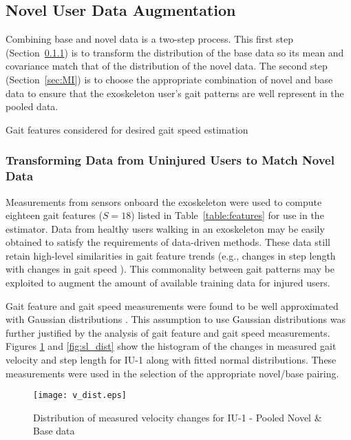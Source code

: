 \subsection{Novel User Data Augmentation}

Combining base and novel data is a two-step process. This first step (Section~\ref{sec:mp_transform}) is to transform the distribution of the base data so its mean and covariance match that of the distribution of the novel data. The second step (Section~\ref{sec:MI}) is to choose the appropriate combination of novel and base data to ensure that the exoskeleton user's gait patterns are well represent in the pooled data.

\begin{table}
	\footnotesize
	\centering
	\caption{Gait features considered for desired gait speed estimation }\label{table:features}
	
\end{table}

\subsubsection{Transforming Data from Uninjured Users to Match Novel Data} \label{sec:mp_transform}
Measurements from sensors onboard the exoskeleton were used to compute eighteen gait features ($S=18$) listed in Table~\ref{table:features} for use in the estimator. Data from healthy users walking in an exoskeleton may be easily obtained to satisfy the requirements of data-driven methods. These data still retain high-level similarities in gait feature trends (e.g., changes in step length with changes in gait speed \cite{karulkar2021using}). This commonality between gait patterns may be exploited to augment the amount of available training data for injured users.

Gait feature and gait speed measurements were found to be well approximated with Gaussian distributions \cite{austin2011disambiguation}. This assumption to use Gaussian distributions was further justified by the analysis of gait feature and gait speed measurements. Figures \ref{fig:v_dist} and \ref{fig:sl_dist} show the histogram of the changes in measured gait velocity and step length for IU-1 along with fitted normal distributions. These measurements were used in the selection of the appropriate novel/base pairing. 

\begin{figure}
	\centering
	\texttt{[image: v\_dist.eps]}
	\caption{Distribution of measured velocity changes for IU-1 - Pooled Novel \& Base data}\label{fig:v_dist}
\end{figure}


